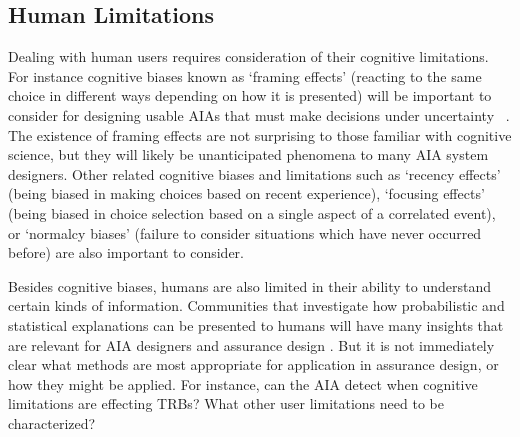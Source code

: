 \subsection{Human Limitations}
Dealing with human users requires consideration of their cognitive limitations. For instance cognitive biases known as `framing effects' (reacting to the same choice in different ways depending on how it is presented) will be important to consider for designing usable AIAs that must make decisions under uncertainty ~\cite{Freedy2007-sg,Riley1996-qm}. The existence of framing effects are not surprising to those familiar with cognitive science, but they will likely be unanticipated phenomena to many AIA system designers. Other related cognitive biases and limitations such as `recency effects' (being biased in making choices based on recent experience), `focusing effects' (being biased in choice selection based on a single aspect of a correlated event), or `normalcy biases' (failure to consider situations which have never occurred before) are also important to consider. 

Besides cognitive biases, humans are also limited in their ability to understand certain kinds of information. Communities that investigate how probabilistic and statistical explanations can be presented to humans will have many insights that are relevant for AIA designers and assurance design \cite{Rouse1986-dz,Wallace2001-fm,Kuhn1997-qc,Lomas2012-ie,Swartout1983-ko}. But it is not immediately clear what methods are most appropriate for application in assurance design, or how they might be applied. For instance, can the AIA detect when cognitive limitations are effecting TRBs? What other user limitations need to be characterized? 



